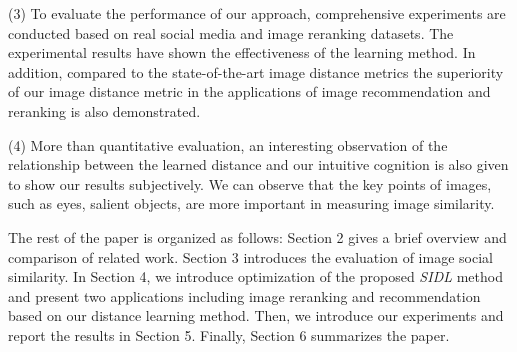 (3) To evaluate the performance of our approach, comprehensive experiments are conducted based on real social media and image reranking datasets. The experimental results have shown the effectiveness of the learning method. In addition, compared to the state-of-the-art image distance metrics the superiority of our image distance metric in the applications of image recommendation and reranking is also demonstrated.

(4) More than quantitative evaluation, an interesting observation of the relationship between the learned distance and our intuitive cognition is also given to show our results subjectively. We can observe that the key points of images, such as eyes, salient objects, are more important in measuring image similarity.

The rest of the paper is organized as follows: Section 2 gives a brief overview and comparison of related work. Section 3 introduces the evaluation of image social similarity. In Section 4, we introduce optimization of the proposed \emph{SIDL} method and present two applications including image reranking and recommendation based on our distance learning method. Then, we introduce our experiments and report the results in Section 5. Finally, Section 6 summarizes the paper.
